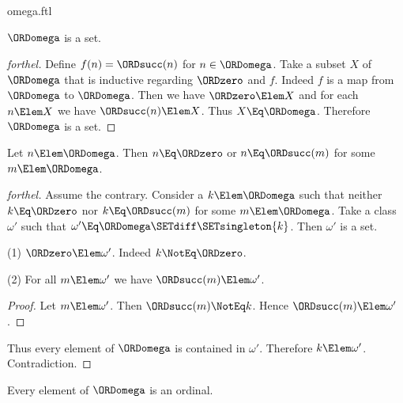 \documentclass{stex}
\begin{document}
\begin{smodule}{omega.ftl}
\begin{corollary}[forthel]
  $\ORDomega$ is a set.
\end{corollary}
\begin{proof}[forthel]
  Define $f(n) = \ORDsucc(n)$ for $n \in \ORDomega$.
  Take a subset $X$ of $\ORDomega$ that is inductive regarding $\ORDzero$ and $f$.
  Indeed $f$ is a map from $\ORDomega$ to $\ORDomega$.
  Then we have $\ORDzero \Elem X$ and for each $n \Elem X$ we have $\ORDsucc(n) \Elem X$.
  Thus $X \Eq \ORDomega$.
  Therefore $\ORDomega$ is a set.
\end{proof}

\begin{proposition}[forthel]
  Let $n \Elem \ORDomega$.
  Then $n \Eq \ORDzero$ or $n \Eq \ORDsucc(m)$ for some $m \Elem \ORDomega$.
\end{proposition}
\begin{proof}[forthel]
  Assume the contrary.
  Consider a $k \Elem \ORDomega$ such that neither $k \Eq \ORDzero$ nor $k \Eq \ORDsucc(m)$ for
  some $m \Elem \ORDomega$.
  Take a class $\omega'$ such that $\omega' \Eq \ORDomega \SETdiff \SETsingleton{k}$. %
  Then $\omega'$ is a set.

  (1) $\ORDzero \Elem \omega'$.
  Indeed $k \NotEq \ORDzero$.

  (2) For all $m \Elem \omega'$ we have $\ORDsucc(m) \Elem \omega'$.
  \begin{proof}
    Let $m \Elem \omega'$.
    Then $\ORDsucc(m) \NotEq k$.
    Hence $\ORDsucc(m) \Elem \omega'$.
  \end{proof}

  Thus every element of $\ORDomega$ is contained in $\omega'$.
  Therefore $k \Elem \omega'$.
  Contradiction.
\end{proof}

\begin{proposition}[forthel]
  Every element of $\ORDomega$ is an ordinal.
\end{proposition}
\end{smodule}
\end{document}
